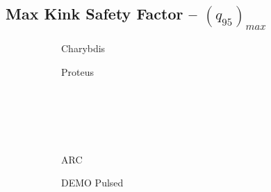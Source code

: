 \clearpage

\newpage

\subsection*{ Max Kink Safety Factor -- $({q_{95}})_{max}$ }
\label{subsection:sensitivity_max_q_95}

\begin{figure*}[h!]
    \centering
    \hfill
    \begin{subfigure}[t]{0.45\textwidth}
        \centering
    \begin{adjustbox}{width=\textwidth}
      \Large
      
    \end{adjustbox}
        \caption{Charybdis}
    \end{subfigure}
    \hfill
    \begin{subfigure}[t]{0.45\textwidth}
        \centering
    \begin{adjustbox}{width=\textwidth}
      \Large
      
    \end{adjustbox}
        \caption{Proteus}
    \end{subfigure}
    \hfill \hfill ~\\ ~\\ ~\\ ~\\
    \hfill
    \begin{subfigure}[t]{0.45\textwidth}
        \centering
    \begin{adjustbox}{width=\textwidth}
      \Large
      
    \end{adjustbox}
        \caption{ARC}
    \end{subfigure}
    \hfill
    \begin{subfigure}[t]{0.45\textwidth}
        \centering
    \begin{adjustbox}{width=\textwidth}
      \Large
      
    \end{adjustbox}
        \caption{DEMO Pulsed}
    \end{subfigure}
    \hfill \hfill ~\\ ~\\ ~\\ ~\\
    \hfill
    \begin{subfigure}[t]{0.45\textwidth}

\end{subfigure}
\end{figure*}
